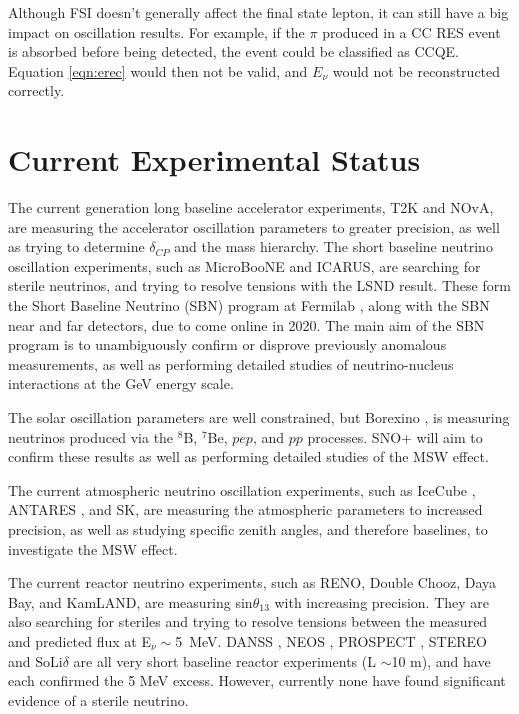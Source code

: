 Although FSI doesn't generally affect the final state lepton, it can still have a big impact on oscillation results. For example, if the $\pi$ produced in a CC RES event is absorbed before being detected, the event could be classified as CCQE. Equation \eqref{eqn:erec} would then not be valid, and $E_\nu$ would not be reconstructed correctly. 

\section{Current Experimental Status}\label{sec:status}

The current generation long baseline accelerator experiments, T2K and NOvA, are measuring the accelerator oscillation parameters to greater precision, as well as trying to determine $\delta_{CP}$ and the mass hierarchy. The short baseline neutrino oscillation experiments, such as MicroBooNE \cite{microboone} and ICARUS, are searching for sterile neutrinos, and trying to resolve tensions with the LSND result. These form the Short Baseline Neutrino (SBN) program at Fermilab \cite{sbn}, along with the SBN near and far detectors, due to come online in 2020. The main aim of the SBN program is to unambiguously confirm or disprove previously anomalous measurements, as well as performing detailed studies of neutrino-nucleus interactions at the GeV energy scale.

The solar oscillation parameters are well constrained, but Borexino \cite{borexino}, is measuring neutrinos produced via the $^8$B, $^7$Be, $pep$, and $pp$ processes. SNO+ \cite{snoplus} will aim to confirm these results as well as performing detailed studies of the MSW effect.

The current atmospheric neutrino oscillation experiments, such as IceCube \cite{icecube}, ANTARES \cite{antares}, and SK, are measuring the atmospheric parameters to increased precision, as well as studying specific zenith angles, and therefore baselines, to investigate the MSW effect.

The current reactor neutrino experiments, such as RENO, Double Chooz, Daya Bay, and KamLAND, are measuring sin$\theta_{13}$ with increasing precision. They are also searching for steriles and trying to resolve tensions between the measured and predicted flux at E$_\nu\sim$5~MeV. DANSS \cite{danss}, NEOS \cite{neos}, PROSPECT \cite{prospect}, STEREO \cite{stereo} and SoLi$\delta$ \cite{solid} are all very short baseline reactor experiments (L $\sim$10 m), and have each confirmed the 5 MeV excess. However, currently none have found significant evidence of a sterile neutrino.

